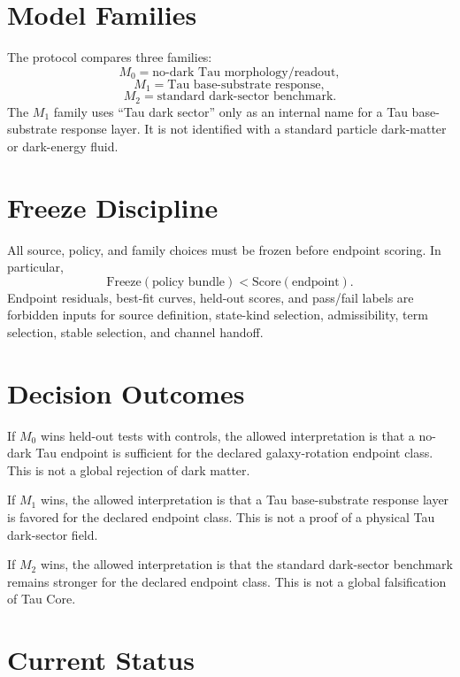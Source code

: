 \documentclass[11pt]{article}
\begin{document}
\section{Model Families}

The protocol compares three families:
\[
M_0 = \text{no-dark Tau morphology/readout},
\]
\[
M_1 = \text{Tau base-substrate response},
\]
\[
M_2 = \text{standard dark-sector benchmark}.
\]
The \(M_1\) family uses ``Tau dark sector'' only as an internal name for a Tau
base-substrate response layer. It is not identified with a standard particle
dark-matter or dark-energy fluid.

\section{Freeze Discipline}

All source, policy, and family choices must be frozen before endpoint scoring.
In particular,
\[
\mathrm{Freeze}(\text{policy bundle}) < \mathrm{Score}(\text{endpoint}).
\]
Endpoint residuals, best-fit curves, held-out scores, and pass/fail labels are
forbidden inputs for source definition, state-kind selection, admissibility,
term selection, stable selection, and channel handoff.

\section{Decision Outcomes}

If \(M_0\) wins held-out tests with controls, the allowed interpretation is
that a no-dark Tau endpoint is sufficient for the declared galaxy-rotation
endpoint class. This is not a global rejection of dark matter.

If \(M_1\) wins, the allowed interpretation is that a Tau base-substrate
response layer is favored for the declared endpoint class. This is not a proof
of a physical Tau dark-sector field.

If \(M_2\) wins, the allowed interpretation is that the standard dark-sector
benchmark remains stronger for the declared endpoint class. This is not a
global falsification of Tau Core.

\section{Current Status}
\end{document}
